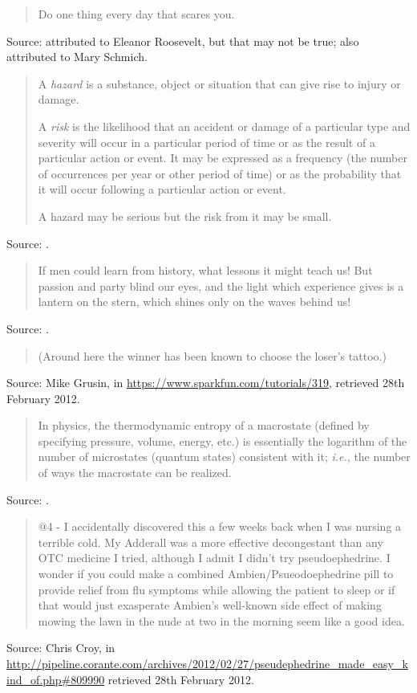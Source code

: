\documentclass[a4paper]{article}
\begin{document}
\begin{quote}
	Do one thing every day that scares you.
\end{quote}
Source: attributed to Eleanor Roosevelt, but that may not be true; also attributed to Mary Schmich.
\medskip

\begin{quote}
	A \emph{hazard} is a substance, object or situation that can give rise to injury or damage.

A \emph{risk} is the likelihood that an accident or damage of a particular type and severity will
occur in a particular period of time or as the result of a particular action or event.  It may be
expressed as a frequency (the number of occurrences per year or other period of time) or as the
probability that it will occur following a particular action or event.

A hazard may be serious but the risk from it may be small.
\end{quote}
Source: \citet{Kletz1999b}.
\medskip

\begin{quote}
	If men could learn from history, what lessons it might teach us!  But passion and party blind
our eyes, and the light which experience gives is a lantern on the stern, which shines only on the
waves behind us!
\end{quote}
Source: \citet[p.~147]{Coleridge1836}.
\medskip

\begin{quote}
	(Around here the winner has been known to choose the loser's tattoo.)
\end{quote}
Source: Mike Grusin, in \url{https://www.sparkfun.com/tutorials/319}, retrieved 28th February 2012.
\medskip

\begin{quote}
	In physics, the thermodynamic entropy of a macrostate (defined by specifying pressure, volume,
energy, etc.) is essentially the logarithm of the number of microstates (quantum states) consistent
with it; \emph{i.e.}, the number of ways the macrostate can be realized.
\end{quote}
Source: \citet[p.~2]{Jaynes1991}.
\medskip

\begin{quote}
	@4 - I accidentally discovered this a few weeks back when I was nursing a terrible cold. My
Adderall was a more effective decongestant than any OTC medicine I tried, although I admit I didn't
try pseudoephedrine. I wonder if you could make a combined Ambien/Psueodoephedrine pill to provide
relief from flu symptoms while allowing the patient to sleep or if that would just exasperate
Ambien's well-known side effect of making mowing the lawn in the nude at two in the morning seem
like a good idea.
\end{quote}
Source: Chris Croy, in
\url{http://pipeline.corante.com/archives/2012/02/27/pseudephedrine_made_easy_kind_of.php#809990}
retrieved 28th February 2012.
\medskip
\end{document}
